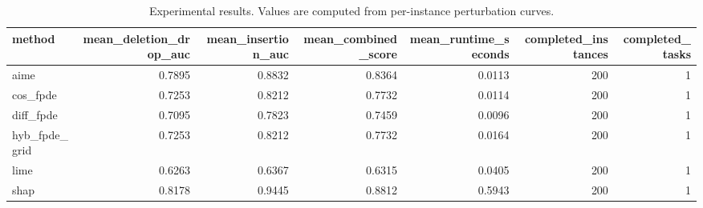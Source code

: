 \begin{table}[t]
\caption{Experimental results. Values are computed from per-instance perturbation curves.}
\label{tab:main_results_computed}
\centering
\begin{tabular}{lrrrrrr}
\toprule
method & mean\_deletion\_drop\_auc & mean\_insertion\_auc & mean\_combined\_score & mean\_runtime\_seconds & completed\_instances & completed\_tasks \\
\midrule
aime & 0.7895 & 0.8832 & 0.8364 & 0.0113 & 200 & 1 \\
cos\_fpde & 0.7253 & 0.8212 & 0.7732 & 0.0114 & 200 & 1 \\
diff\_fpde & 0.7095 & 0.7823 & 0.7459 & 0.0096 & 200 & 1 \\
hyb\_fpde\_grid & 0.7253 & 0.8212 & 0.7732 & 0.0164 & 200 & 1 \\
lime & 0.6263 & 0.6367 & 0.6315 & 0.0405 & 200 & 1 \\
shap & 0.8178 & 0.9445 & 0.8812 & 0.5943 & 200 & 1 \\
\bottomrule
\end{tabular}

\end{table}
